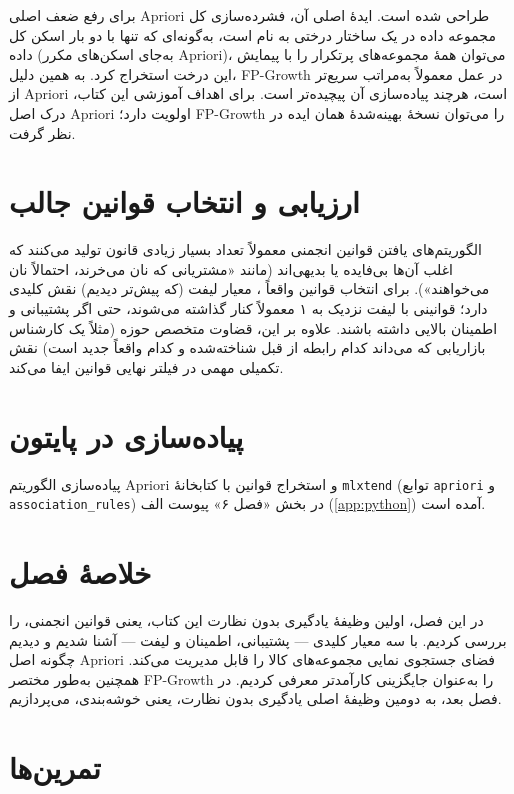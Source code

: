  برای
رفع ضعف اصلی Apriori طراحی شده است. ایدهٔ اصلی آن، فشرده‌سازی کل
مجموعه داده در یک ساختار درختی به نام
 است، به‌گونه‌ای که تنها با دو
بار اسکن کل داده (به‌جای اسکن‌های مکرر Apriori)، می‌توان همهٔ مجموعه‌های
پرتکرار را با پیمایش این درخت استخراج کرد. به همین دلیل، FP-Growth در
عمل معمولاً به‌مراتب سریع‌تر از Apriori است، هرچند پیاده‌سازی آن پیچیده‌تر
است. برای اهداف آموزشی این کتاب، درک اصل Apriori اولویت دارد؛ FP-Growth
را می‌توان نسخهٔ بهینه‌شدهٔ همان ایده در نظر گرفت.

\section{ارزیابی و انتخاب قوانین جالب}

الگوریتم‌های یافتن قوانین انجمنی معمولاً تعداد بسیار زیادی قانون تولید
می‌کنند که اغلب آن‌ها بی‌فایده یا بدیهی‌اند (مانند «مشتریانی که نان
می‌خرند، احتمالاً نان می‌خواهند»). برای انتخاب قوانین واقعاً
، معیار لیفت (که پیش‌تر دیدیم) نقش
کلیدی دارد؛ قوانینی با لیفت نزدیک به ۱ معمولاً کنار گذاشته می‌شوند، حتی
اگر پشتیبانی و اطمینان بالایی داشته باشند. علاوه بر این، قضاوت متخصص
حوزه (مثلاً یک کارشناس بازاریابی که می‌داند کدام رابطه از قبل شناخته‌شده
و کدام واقعاً جدید است) نقش تکمیلی مهمی در فیلتر نهایی قوانین ایفا
می‌کند.

\section*{پیاده‌سازی در پایتون}

پیاده‌سازی الگوریتم Apriori و استخراج قوانین با کتابخانهٔ
\texttt{mlxtend} (توابع \texttt{apriori} و \texttt{association\_rules})
در بخش «فصل ۶» پیوست الف (\ref{app:python}) آمده است.

\section*{خلاصهٔ فصل}

در این فصل، اولین وظیفهٔ یادگیری بدون نظارت این کتاب، یعنی قوانین
انجمنی، را بررسی کردیم. با سه معیار کلیدی — پشتیبانی، اطمینان و لیفت —
آشنا شدیم و دیدیم چگونه اصل Apriori فضای جستجوی نمایی مجموعه‌های کالا
را قابل مدیریت می‌کند. همچنین به‌طور مختصر FP-Growth را به‌عنوان
جایگزینی کارآمدتر معرفی کردیم. در فصل بعد، به دومین وظیفهٔ اصلی یادگیری
بدون نظارت، یعنی خوشه‌بندی، می‌پردازیم.

\section*{تمرین‌ها}

